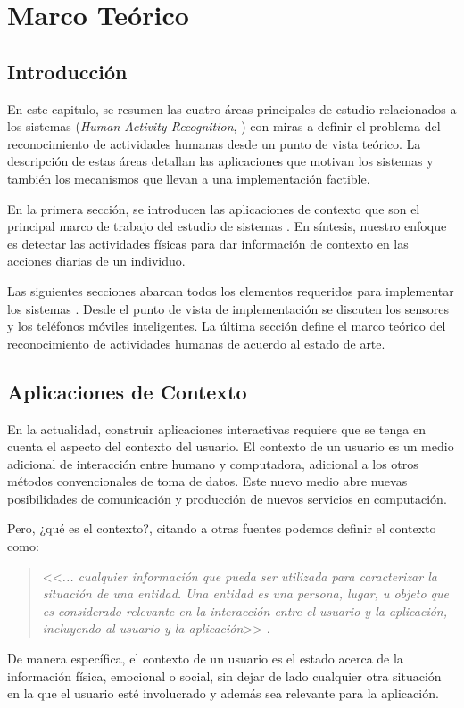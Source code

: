 
\chapter{Marco Teórico}

\label{chap2:marco-teorico}

\section{Introducción}

\label{sec21:introduccion}En este capitulo, se resumen las cuatro
áreas principales de estudio relacionados a los sistemas (\emph{Human
Activity Recognition}, ) con miras a definir el problema
del reconocimiento de actividades humanas desde un punto de vista
teórico. La descripción de estas áreas detallan las aplicaciones que
motivan los sistemas  y también los mecanismos que llevan
a una implementación factible. 

En la primera sección, se introducen las aplicaciones de contexto
que son el principal marco de trabajo del estudio de sistemas .
En síntesis, nuestro enfoque es detectar las actividades físicas para
dar información de contexto en las acciones diarias de un individuo. 

Las siguientes secciones abarcan todos los elementos requeridos para
implementar los sistemas . Desde el punto de vista de implementación
se discuten los sensores y los teléfonos móviles inteligentes. La
última sección define el marco teórico del reconocimiento de actividades
humanas de acuerdo al estado de arte.

\section{Aplicaciones de Contexto}

\label{sec22:contexto}En la actualidad, construir aplicaciones interactivas
requiere que se tenga en cuenta el aspecto del contexto del usuario.
El contexto de un usuario es un medio adicional de interacción entre
humano y computadora, adicional a los otros métodos convencionales
de toma de datos. Este nuevo medio abre nuevas posibilidades de comunicación
y producción de nuevos servicios en computación. 

Pero, ¿qué es el contexto?, citando a otras fuentes podemos definir
el contexto como: 
\begin{quotation}
<<\emph{... cualquier información que pueda ser utilizada para caracterizar
la situación de una entidad. Una entidad es una persona, lugar, u
objeto que es considerado relevante en la interacción entre el usuario
y la aplicación, incluyendo al usuario y la aplicación}>> \cite{Dey2000}. 
\end{quotation}
De manera específica, el contexto de un usuario es el estado acerca
de la información física, emocional o social, sin dejar de lado cualquier
otra situación en la que el usuario esté involucrado y además sea
relevante para la aplicación.

